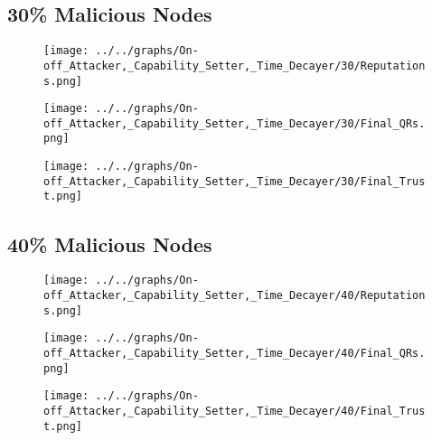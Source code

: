 \begin{minipage}[t]{0.49\columnwidth}
\subsection*{30\% Malicious Nodes}
    \begin{figure}[H]
        \centering
        \texttt{[image: ../../graphs/On-off\_Attacker,\_Capability\_Setter,\_Time\_Decayer/30/Reputations.png]}
    \end{figure}
    \begin{figure}[H]
        \centering
        \texttt{[image: ../../graphs/On-off\_Attacker,\_Capability\_Setter,\_Time\_Decayer/30/Final\_QRs.png]}
    \end{figure}
\end{minipage}
\begin{minipage}[t]{0.49\columnwidth}
    \begin{figure}[H]
        \centering
        \texttt{[image: ../../graphs/On-off\_Attacker,\_Capability\_Setter,\_Time\_Decayer/30/Final\_Trust.png]}
    \end{figure}
\end{minipage}

\begin{minipage}[t]{0.49\columnwidth}
\subsection*{40\% Malicious Nodes}
    \begin{figure}[H]
        \centering
        \texttt{[image: ../../graphs/On-off\_Attacker,\_Capability\_Setter,\_Time\_Decayer/40/Reputations.png]}
    \end{figure}
    \begin{figure}[H]
        \centering
        \texttt{[image: ../../graphs/On-off\_Attacker,\_Capability\_Setter,\_Time\_Decayer/40/Final\_QRs.png]}
    \end{figure}
\end{minipage}
\begin{minipage}[t]{0.49\columnwidth}
    \begin{figure}[H]
        \centering
        \texttt{[image: ../../graphs/On-off\_Attacker,\_Capability\_Setter,\_Time\_Decayer/40/Final\_Trust.png]}
    \end{figure}
\end{minipage}

